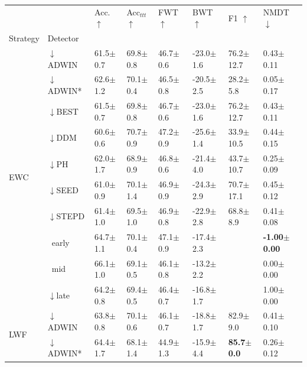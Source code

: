 \begin{tabular}{llllllll}
\toprule
 &  & Acc. $\uparrow$ & Acc$_{ttt}$ $\uparrow$ & FWT $\uparrow$ & BWT $\uparrow$ & F1 $\uparrow$ & NMDT $\downarrow$ \\
Strategy & Detector &  &  &  &  &  &  \\
\midrule
\multirow[t]{10}{*}{EWC} & $\downarrow$ADWIN & 61.5\tiny{$\pm$0.7} & 69.8\tiny{$\pm$0.8} & 46.7\tiny{$\pm$0.6} & -23.0\tiny{$\pm$1.6} & 76.2\tiny{$\pm$12.7} & 0.43\tiny{$\pm$0.11} \\
 & $\downarrow$ADWIN* & 62.6\tiny{$\pm$1.2} & 70.1\tiny{$\pm$0.4} & 46.5\tiny{$\pm$0.8} & -20.5\tiny{$\pm$2.5} & 28.2\tiny{$\pm$5.8} & 0.05\tiny{$\pm$0.17} \\
 & $\downarrow$BEST & 61.5\tiny{$\pm$0.7} & 69.8\tiny{$\pm$0.8} & 46.7\tiny{$\pm$0.6} & -23.0\tiny{$\pm$1.6} & 76.2\tiny{$\pm$12.7} & 0.43\tiny{$\pm$0.11} \\
 & $\downarrow$DDM & 60.6\tiny{$\pm$0.6} & 70.7\tiny{$\pm$0.9} & 47.2\tiny{$\pm$0.9} & -25.6\tiny{$\pm$1.4} & 33.9\tiny{$\pm$10.5} & 0.44\tiny{$\pm$0.15} \\
 & $\downarrow$PH & 62.0\tiny{$\pm$1.7} & 68.9\tiny{$\pm$0.9} & 46.8\tiny{$\pm$0.6} & -21.4\tiny{$\pm$4.0} & 43.7\tiny{$\pm$10.7} & 0.25\tiny{$\pm$0.09} \\
 & $\downarrow$SEED & 61.0\tiny{$\pm$0.9} & 70.1\tiny{$\pm$1.4} & 46.9\tiny{$\pm$0.9} & -24.3\tiny{$\pm$2.9} & 70.7\tiny{$\pm$17.1} & 0.45\tiny{$\pm$0.12} \\
 & $\downarrow$STEPD & 61.4\tiny{$\pm$1.0} & 69.5\tiny{$\pm$1.0} & 46.9\tiny{$\pm$0.8} & -22.9\tiny{$\pm$2.8} & 68.8\tiny{$\pm$8.9} & 0.41\tiny{$\pm$0.08} \\
 & $\ \;$early & 64.7\tiny{$\pm$1.1} & 70.1\tiny{$\pm$0.4} & 47.1\tiny{$\pm$0.9} & -17.4\tiny{$\pm$2.3} &  & \textbf{-1.00\tiny{$\pm$0.00}} \\
 & $\ \;$mid & 66.1\tiny{$\pm$1.0} & 69.1\tiny{$\pm$0.5} & 46.1\tiny{$\pm$0.8} & -13.2\tiny{$\pm$2.2} &  & 0.00\tiny{$\pm$0.00} \\
 & $\downarrow$late & 64.2\tiny{$\pm$0.8} & 69.4\tiny{$\pm$0.5} & 46.4\tiny{$\pm$0.7} & -16.8\tiny{$\pm$1.7} &  & 1.00\tiny{$\pm$0.00} \\
\midrule
\multirow[t]{10}{*}{LWF} & $\downarrow$ADWIN & 63.8\tiny{$\pm$0.8} & 70.1\tiny{$\pm$0.6} & 46.1\tiny{$\pm$0.7} & -18.8\tiny{$\pm$1.7} & 82.9\tiny{$\pm$9.0} & 0.41\tiny{$\pm$0.10} \\
 & $\downarrow$ADWIN* & 64.4\tiny{$\pm$1.7} & 68.1\tiny{$\pm$1.4} & 44.9\tiny{$\pm$1.3} & -15.9\tiny{$\pm$4.4} & \textbf{85.7\tiny{$\pm$0.0}} & 0.26\tiny{$\pm$0.12} \\

\end{tabular}
